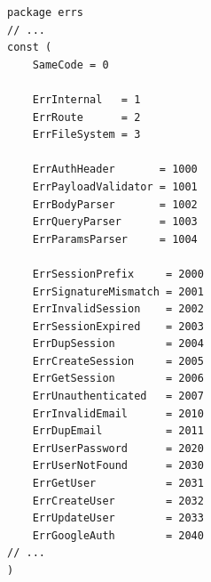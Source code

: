 \documentclass[12pt,one side,openright,a4paper]{cpe-thesis-th}
\begin{document}
\pagebreak
\begin{lstlisting}[label={lst:appendix-domain-error-code}, caption={ตัวอย่างชุดคำสั่งนิยามรหัสข้อผิดพลาด (Error code)}]
package errs
// ...
const (
	SameCode = 0

	ErrInternal   = 1
	ErrRoute      = 2
	ErrFileSystem = 3

	ErrAuthHeader       = 1000
	ErrPayloadValidator = 1001
	ErrBodyParser       = 1002
	ErrQueryParser      = 1003
	ErrParamsParser     = 1004

	ErrSessionPrefix     = 2000
	ErrSignatureMismatch = 2001
	ErrInvalidSession    = 2002
	ErrSessionExpired    = 2003
	ErrDupSession        = 2004
	ErrCreateSession     = 2005
	ErrGetSession        = 2006
	ErrUnauthenticated   = 2007
	ErrInvalidEmail      = 2010
	ErrDupEmail          = 2011
	ErrUserPassword      = 2020
	ErrUserNotFound      = 2030
	ErrGetUser           = 2031
	ErrCreateUser        = 2032
	ErrUpdateUser        = 2033
	ErrGoogleAuth        = 2040
// ...
)
\end{lstlisting}
\pagebreak
\end{document}
